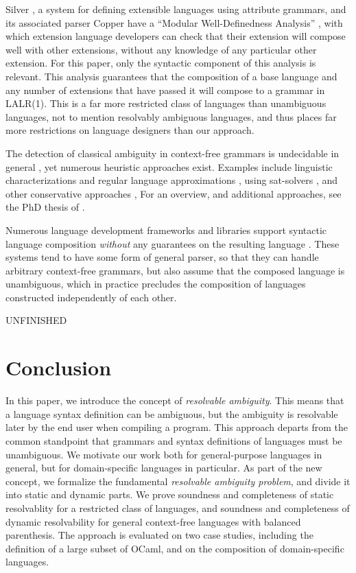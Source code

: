 \documentclass[acmsmall,review,anonymous]{acmart}\settopmatter{printfolios=true,printccs=false,printacmref=false}
\begin{document}
Silver \cite{vanwykSilverExtensibleAttribute2010}, a system for defining extensible languages using attribute grammars, and its associated parser Copper \cite{} have a ``Modular Well-Definedness Analysis'' \cite{kaminskiModularWellDefinednessAnalysis2013}, with which extension language developers can check that their extension will compose well with other extensions, without any knowledge of any particular other extension. For this paper, only the syntactic component \cite{schwerdfegerVerifiableCompositionDeterministic2009} of this analysis is relevant. This analysis guarantees that the composition of a base language and any number of extensions that have passed it will compose to a grammar in LALR(1). This is a far more restricted class of languages than unambiguous languages, not to mention resolvably ambiguous languages, and thus places far more restrictions on language designers than our approach.

The detection of classical ambiguity in context-free grammars is undecidable in general \cite{cantorAmbiguityProblemBackus1962}, yet numerous heuristic approaches exist. Examples include linguistic characterizations and regular language approximations \cite{brabrandAnalyzingAmbiguityContextFree2007}, using sat-solvers \cite{axelssonAnalyzingContextFreeGrammars2008}, and other conservative approaches \cite{schmitzConservativeAmbiguityDetection2007}, For an overview, and additional approaches, see the PhD thesis of \citet{bastenAmbiguityDetectionProgramming2011}.

Numerous language development frameworks and libraries support syntactic language composition \emph{without} any guarantees on the resulting language \cite{heeringSyntaxDefinitionFormalism1989}. These systems tend to have some form of general parser, so that they can handle arbitrary context-free grammars, but also assume that the composed language is unambiguous, which in practice precludes the composition of languages constructed independently of each other.

UNFINISHED

\section{Conclusion}
In this paper, we introduce the concept of \emph{resolvable ambiguity}. This means that a language syntax definition can be ambiguous, but the ambiguity is resolvable later by the end user when compiling a program. This approach departs from the common standpoint that grammars and syntax definitions of languages must be unambiguous. We motivate our work both for general-purpose languages in general, but for domain-specific languages in particular. As part of the new concept, we formalize the fundamental \emph{resolvable ambiguity problem}, and divide it into static and dynamic parts. We prove soundness and completeness of static resolvablity for a restricted class of languages, and soundness and completeness of dynamic resolvability for general context-free languages with balanced parenthesis. The approach is evaluated on two case studies, including the definition of a large subset of OCaml, and on the composition of domain-specific languages.
\end{document}
